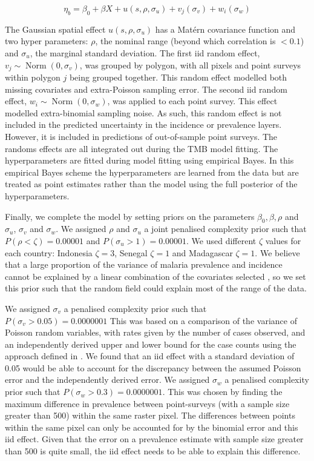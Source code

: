 \documentclass[10pt,letterpaper]{article}
\begin{document}
$$\eta_b = \beta_0 + \beta X  + u(s, \rho, \sigma_u) + v_j(\sigma_v) + w_i(\sigma_w)$$

The Gaussian spatial effect $u(s, \rho, \sigma_u)$ has a Mat\'ern covariance function and two hyper parameters: $\rho$, the nominal range (beyond which correlation is $< 0.1$) and $\sigma_u$, the marginal standard deviation.
The first iid random effect, $v_j \sim \operatorname{Norm}(0, \sigma_v)$,  was grouped by polygon, with all pixels and point surveys within polygon $j$ being grouped together.
This random effect modelled both missing covariates and extra-Poisson sampling error. 
The second iid random effect, $w_i \sim \operatorname{Norm}(0, \sigma_w)$, was applied to each point survey.
This effect modelled extra-binomial sampling noise.
As such, this random effect is not included in the predicted uncertainty in the incidence or prevalence layers.
However, it is included in predictions of out-of-sample point surveys.
The randoms effects are all integrated out during the TMB model fitting.
The hyperparameters are fitted during model fitting using empirical Bayes.
In this empirical Bayes scheme the hyperparameters are learned from the data but are treated as point estimates rather than the model using the full posterior of the hyperparameters.



Finally, we complete the model by setting priors on the parameters $\beta_0, \beta, \rho$ and $\sigma_u$, $\sigma_v$ and $\sigma_w$.
We assigned $\rho$ and $\sigma_u$ a joint penalised complexity prior \cite{fuglstad2018constructing} such that $P(\rho < \zeta) = 0.00001$ and $P(\sigma_u > 1) = 0.00001$.
We used different $\zeta$ values for each country: Indonesia $\zeta = 3$, Senegal $\zeta = 1$ and Madagascar $\zeta = 1$.
We believe that a large proportion of the variance of malaria prevalence and incidence cannot be explained by a linear combination of the covariates selected \cite{bhatt2017improved}, so we set this prior such that the random field could explain most of the range of the data.

We assigned $\sigma_v$ a penalised complexity prior \cite{simpson2017penalising} such that $P(\sigma_v > 0.05) = 0.0000001$
This was based on a comparison of the variance of Poisson random variables, with rates given by the number of cases observed, and an independently derived upper and lower bound for the case counts using the approach defined in \cite{cibulskis2011worldwide}.
We found that an iid effect with a standard deviation of 0.05 would be able to account for the discrepancy between the assumed Poisson error and the independently derived error.
We assigned $\sigma_w$ a penalised complexity prior such that $P(\sigma_w > 0.3) = 0.0000001$. 
This was chosen by finding the maximum difference in prevalence between point-surveys (with a sample size greater than 500) within the same raster pixel.
The differences between points within the same pixel can only be accounted for by the binomial error and this iid effect.
Given that the error on a prevalence estimate with sample size greater than 500 is quite small, the iid effect needs to be able to explain this difference.
\end{document}
